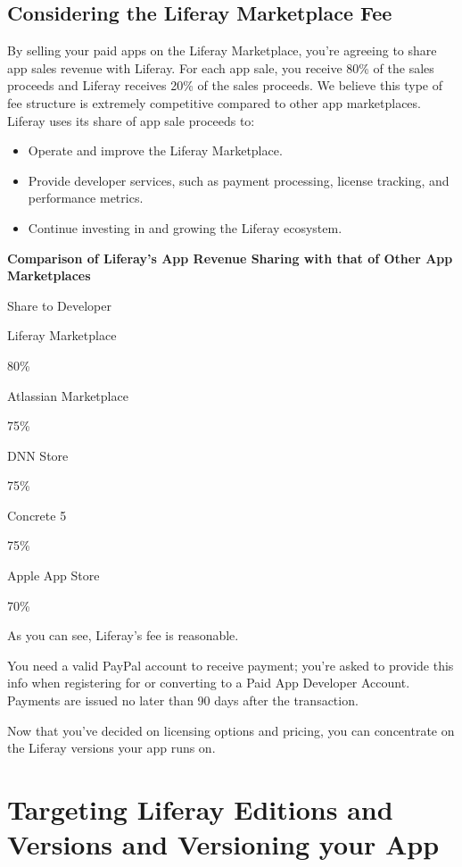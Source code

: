 \subsection{Considering the Liferay Marketplace
Fee}\label{considering-the-liferay-marketplace-fee}

By selling your paid apps on the Liferay Marketplace, you're agreeing to
share app sales revenue with Liferay. For each app sale, you receive
80\% of the sales proceeds and Liferay receives 20\% of the sales
proceeds. We believe this type of fee structure is extremely competitive
compared to other app marketplaces. Liferay uses its share of app sale
proceeds to:

\begin{itemize}
\tightlist
\item
  Operate and improve the Liferay Marketplace.
\item
  Provide developer services, such as payment processing, license
  tracking, and performance metrics.
\item
  Continue investing in and growing the Liferay ecosystem.
\end{itemize}

\textbf{Comparison of Liferay's App Revenue Sharing with that of Other
App Marketplaces}

Share to Developer

Liferay Marketplace

80\%

Atlassian Marketplace

75\%

DNN Store

75\%

Concrete 5

75\%

Apple App Store

70\%

As you can see, Liferay's fee is reasonable.

You need a valid PayPal account to receive payment; you're asked to
provide this info when registering for or converting to a Paid App
Developer Account. Payments are issued no later than 90 days after the
transaction.

Now that you've decided on licensing options and pricing, you can
concentrate on the Liferay versions your app runs on.

\section{Targeting Liferay Editions and Versions and Versioning your
App}\label{targeting-liferay-editions-and-versions-and-versioning-your-app}

